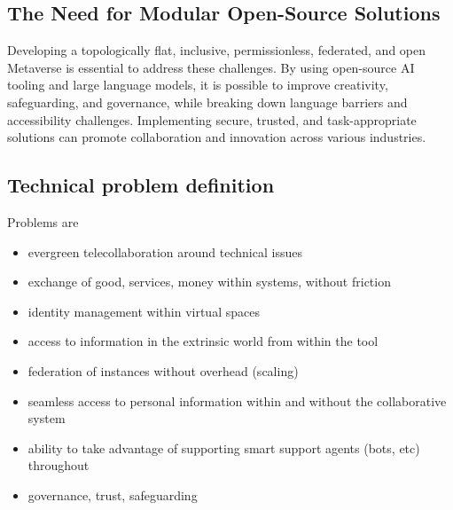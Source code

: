 \subsection{The Need for Modular Open-Source Solutions}
Developing a topologically flat, inclusive, permissionless, federated, and open Metaverse is essential to address these challenges. By using open-source AI tooling and large language models, it is possible to improve creativity, safeguarding, and governance, while breaking down language barriers and accessibility challenges. Implementing secure, trusted, and task-appropriate solutions can promote collaboration and innovation across various industries.

\subsection{Technical problem definition}
Problems are
\begin{itemize}
\item evergreen telecollaboration around technical issues
\item exchange of good, services, money within systems, without friction
\item identity management within virtual spaces
\item access to information in the extrinsic world from within the tool
\item federation of instances without overhead (scaling)
\item seamless access to personal information within and without the collaborative system
\item ability to take advantage of supporting smart support agents (bots, etc) throughout
\item governance, trust, safeguarding
\end{itemize}


